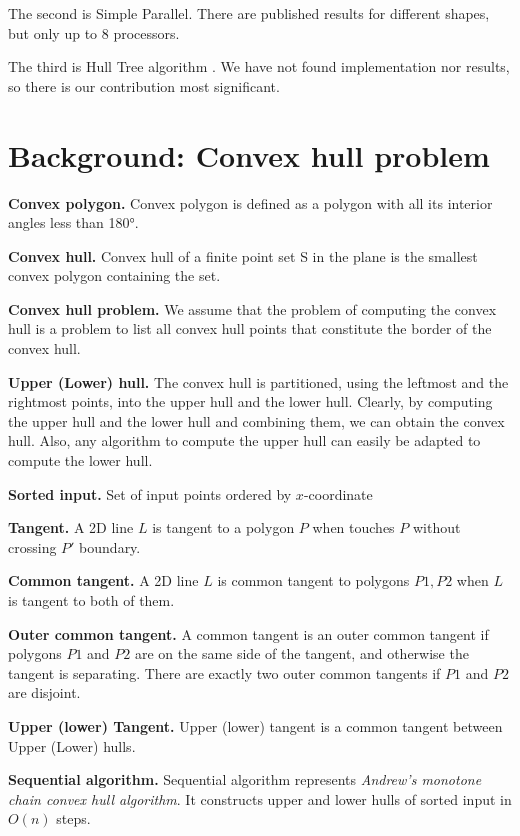 \documentclass[letterpaper]{article}
\newcommand{\mypar}[1]{{\bf #1.}}
\theoremstyle{definition}
\begin{document}
The second is Simple Parallel. \cite{SimpleParallel}  There are published results for different shapes, but only up to 8 processors.   
 
The third is Hull Tree algorithm \cite{HullTree}. We have not found implementation nor results, so there is our contribution most significant.
  
\section{Background: Convex hull problem}\label{sec:background}

\mypar{Convex polygon} Convex polygon is defined as a polygon with all its interior angles less than 180°.

\mypar{Convex hull}
Convex hull of a finite point set S in the plane is the smallest convex polygon containing the set.

\mypar{Convex hull problem}
We assume that the problem of computing the convex hull is a problem to list all convex hull points that constitute the border of the convex hull. 

\mypar{Upper (Lower) hull}
The convex hull is partitioned, using the leftmost and the rightmost points, into the upper
hull and the lower hull. Clearly, by computing the upper hull and the lower hull and combining them, we can obtain the convex hull. Also, any algorithm to compute the upper hull can easily be adapted to compute the lower hull.

\mypar{Sorted input} 
Set of input points ordered by $x$-coordinate

\mypar{Tangent} 
 A 2D line $L$ is tangent to a polygon $P$ when touches $P$ without crossing $P'$ boundary.

\mypar{Common tangent} 
A 2D line $L$ is common tangent to polygons $P1, P2$ when $L$ is tangent to both of them. 

\mypar{Outer common tangent}
A common tangent is an outer common tangent if polygons $P1$ and $P2$ are on the same side of the tangent, and otherwise the tangent is separating.
There are exactly two outer common tangents if $P1$ and $P2$ are disjoint. \cite{DBLP:journals/corr/Abrahamsen15}  

\mypar{Upper (lower) Tangent}
Upper (lower) tangent is a common tangent between Upper (Lower) hulls. 

\mypar{Sequential algorithm}
Sequential algorithm represents \textit{Andrew's monotone chain convex hull algorithm}. It constructs upper and lower hulls of sorted input in $O(n)$ steps. \cite{DBLP:journals/ipl/Andrew79} 
\end{document}
